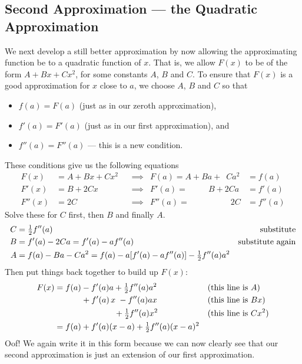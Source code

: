 \subsection{Second Approximation --- the Quadratic Approximation}

We next develop a still better approximation by now allowing the
approximating function be to a quadratic function of $x$. That is,
we allow $F(x)$ to be of the form $A+Bx+Cx^2$, for some constants $A$, $B$
and $C$. To ensure that $F(x)$ is a good approximation for $x$ close
to $a$, we choose $A$, $B$ and $C$ so that
\begin{itemize}
  \item $f(a)=F(a)$  (just as in our zeroth approximation),
  \item $f'(a)=F'(a)$ (just as in our first approximation), and
  \item $f''(a)=F''(a)$ --- this is a new condition.
\end{itemize}
These conditions give us the following equations
\begin{align*}
F(x)&=A+Bx+Cx^2  & &\implies & F(a)=A+Ba+\phantom{2}Ca^2&=f(a)\\
F'(x)&=B+2Cx & &\implies & F'(a)=\phantom{A+a}B+2Ca&=f'(a)\\
F''(x)&=2C   & &\implies & F''(a)=\phantom{A+aB+a}2C&=f''(a)
\end{align*}
Solve these for $C$ first, then $B$ and finally $A$.
\begin{align*}
C &=\tfrac{1}{2} f''(a) & \text{substitute}\\
B &= f'(a) - 2Ca = f'(a)-af''(a) & \text{substitute again}\\
A &= f(a)-Ba-Ca^2 = f(a)-a[f'(a)-af''(a)]-\tfrac{1}{2} f''(a)a^2
\end{align*}
Then put things back together to build up $F(x)$:
\begin{align*}
F(x)&=f(a)-f'(a)a+\tfrac{1}{2} f''(a)a^2 & &\text{(this line is $A$)}\cr
&\phantom{=f(a)\hskip3pt}+f'(a)\,x\hskip3pt- f''(a)ax
   & & \text{(this line is $Bx$)}\\
&\phantom{=f(a)-f'(a)a\hskip3.5pt}+\tfrac{1}{2} f''(a)x^2
 & &\text{(this line is $Cx^2$)}\\
&=f(a)+f'(a)(x-a)+\tfrac{1}{2} f''(a)(x-a)^2
\end{align*}
Oof! We again write it in this form because we can now clearly see that our second
approximation is just an extension of our first approximation.

